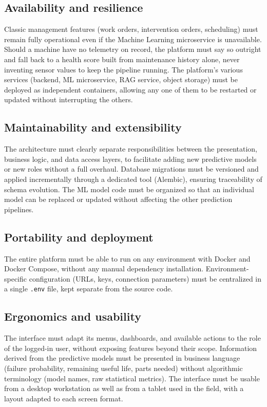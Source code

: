 \subsection{Availability and resilience}

Classic management features (work orders, intervention orders, scheduling) must remain fully operational even if the Machine Learning microservice is unavailable.
Should a machine have no telemetry on record, the platform must say so outright and fall back to a health score built from maintenance history alone, never inventing sensor values to keep the pipeline running.
The platform's various services (backend, ML microservice, RAG service, object storage) must be deployed as independent containers, allowing any one of them to be restarted or updated without interrupting the others.

\subsection{Maintainability and extensibility}

The architecture must clearly separate responsibilities between the presentation, business logic, and data access layers, to facilitate adding new predictive models or new roles without a full overhaul.
Database migrations must be versioned and applied incrementally through a dedicated tool (Alembic), ensuring traceability of schema evolution.
The ML model code must be organized so that an individual model can be replaced or updated without affecting the other prediction pipelines.

\subsection{Portability and deployment}

The entire platform must be able to run on any environment with Docker and Docker Compose, without any manual dependency installation.
Environment-specific configuration (URLs, keys, connection parameters) must be centralized in a single \texttt{.env} file, kept separate from the source code.

\subsection{Ergonomics and usability}

The interface must adapt its menus, dashboards, and available actions to the role of the logged-in user, without exposing features beyond their scope.
Information derived from the predictive models must be presented in business language (failure probability, remaining useful life, parts needed) without algorithmic terminology (model names, raw statistical metrics).
The interface must be usable from a desktop workstation as well as from a tablet used in the field, with a layout adapted to each screen format.

